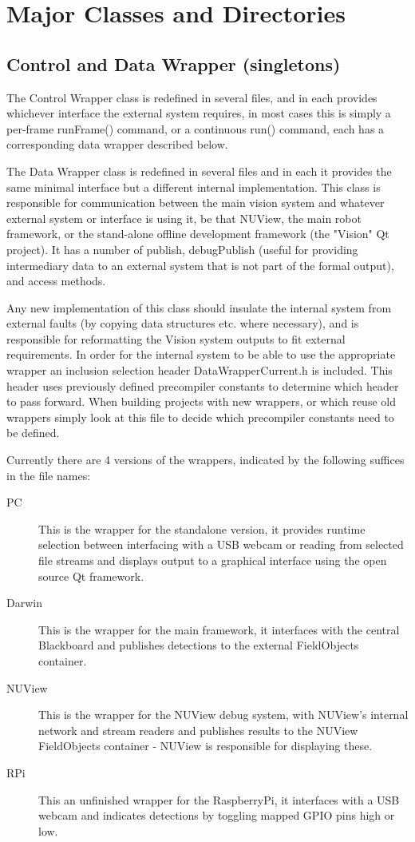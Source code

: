 \documentclass[]{report}
\begin{document}
\chapter{Major Classes and Directories}
\section{Control and Data Wrapper (singletons)}
The Control Wrapper class is redefined in several files, and in each provides whichever interface the external system requires, in most cases this is simply a per-frame runFrame() command, or a continuous run() command, each has a corresponding data wrapper described below.

The Data Wrapper class is redefined in several files and in each it provides the same minimal interface but a different internal implementation. This class is responsible for communication between the main vision system and whatever external system or interface is using it, be that NUView, the main robot framework, or the stand-alone offline development framework (the "Vision" Qt project). It has a number of publish, debugPublish (useful for providing intermediary data to an external system that is not part of the formal output), and access methods.

Any new implementation of this class should insulate the internal system from external faults (by copying data structures etc. where necessary), and is responsible for reformatting the Vision system outputs to fit external requirements. In order for the internal system to be able to use the appropriate wrapper an inclusion selection header DataWrapperCurrent.h is included. This header uses previously defined precompiler constants to determine which header to pass forward. When building projects with new wrappers, or which reuse old wrappers simply look at this file to decide which precompiler constants need to be defined.

Currently there are 4 versions of the wrappers, indicated by the following suffices in the file names:
\begin{description}
\item[PC] This is the wrapper for the standalone version, it provides runtime selection between interfacing with a USB webcam or reading from selected file streams and displays output to a graphical interface using the open source Qt framework.
\item[Darwin] This is the wrapper for the main framework, it interfaces with the central Blackboard and publishes detections to the external FieldObjects container.
\item[NUView] This is the wrapper for the NUView debug system, with NUView's internal network and stream readers and publishes results to the NUView FieldObjects container - NUView is responsible for displaying these.
\item[RPi] This an unfinished wrapper for the RaspberryPi, it interfaces with a USB webcam and indicates detections by toggling mapped GPIO pins high or low.
\end{description}
\end{document}
